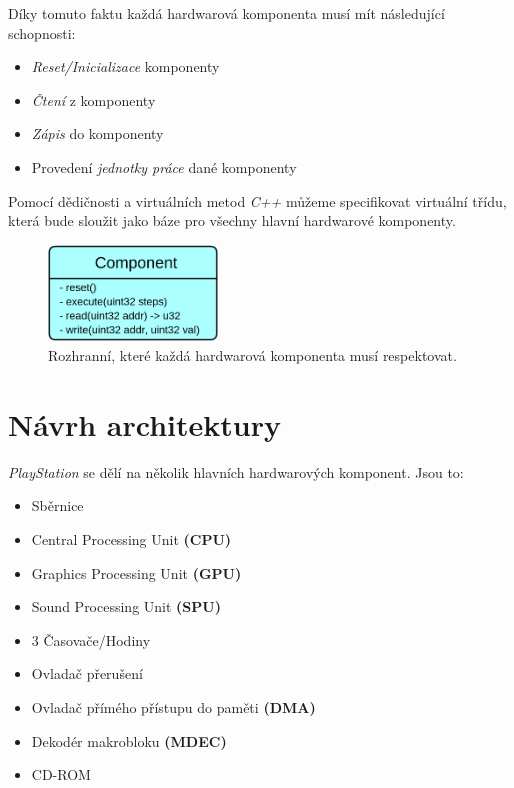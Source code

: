 Díky tomuto faktu každá hardwarová komponenta musí mít následující schopnosti:

\begin{itemize}
    \item{\textit{Reset/Inicializace} komponenty}
    \item{\textit{Čtení} z komponenty}
    \item{\textit{Zápis} do komponenty}
    \item{Provedení \textit{jednotky práce} dané komponenty}
\end{itemize}

Pomocí dědičnosti a virtuálních metod \textit{C++} můžeme specifikovat virtuální třídu,
která bude sloužit jako báze pro všechny hlavní hardwarové komponenty.

\begin{figure}[hbt]
	\centering
	\includegraphics[width=0.4\textwidth]{obrazky-figures/component.png}
	\caption{Rozhranní, které každá hardwarová komponenta musí respektovat.}
	\label{component}
\end{figure}

\section{Návrh architektury}

\textit{PlayStation} se dělí na několik hlavních hardwarových komponent. Jsou to:

\begin{itemize}
    \item{Sběrnice}
    \item{Central Processing Unit \textbf{(CPU)}}
    \item{Graphics Processing Unit \textbf{(GPU)}}
    \item{Sound Processing Unit \textbf{(SPU)}}
    \item{3 Časovače/Hodiny}
    \item{Ovladač přerušení}
    \item{Ovladač přímého přístupu do paměti \textbf{(DMA)}}
    \item{Dekodér makrobloku \textbf{(MDEC)}}
    \item{CD-ROM}
\end{itemize}

